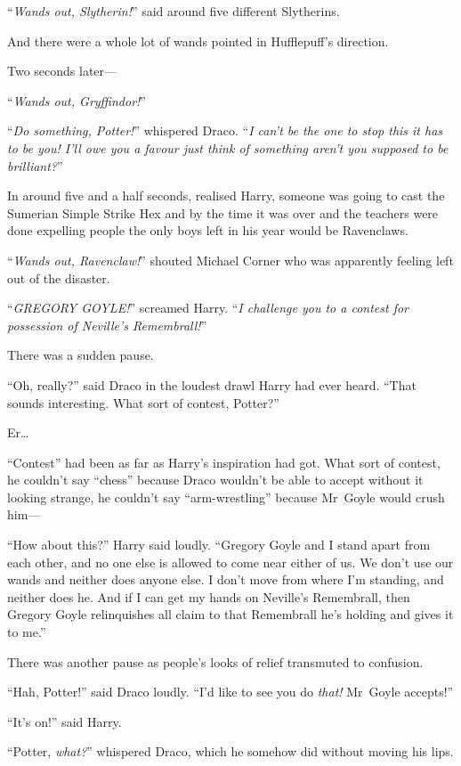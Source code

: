 “\emph{Wands out, Slytherin!}” said around five different Slytherins.

And there were a whole lot of wands pointed in Hufflepuff’s direction.

Two seconds later—

“\emph{Wands out, Gryffindor!}”

“\emph{Do something, Potter!}” whispered Draco. “\emph{I can’t be the one to stop this it has to be you! I’ll owe you a favour just think of something aren’t you supposed to be brilliant?}”

In around five and a half seconds, realised Harry, someone was going to cast the Sumerian Simple Strike Hex and by the time it was over and the teachers were done expelling people the only boys left in his year would be Ravenclaws.

“\emph{Wands out, Ravenclaw!}” shouted Michael Corner who was apparently feeling left out of the disaster.

“\emph{GREGORY GOYLE!}” screamed Harry. “\emph{I challenge you to a contest for possession of Neville’s Remembrall!}”

There was a sudden pause.

“Oh, really?” said Draco in the loudest drawl Harry had ever heard. “That sounds interesting. What sort of contest, Potter?”

Er…

“Contest” had been as far as Harry’s inspiration had got. What sort of contest, he couldn’t say “chess” because Draco wouldn’t be able to accept without it looking strange, he couldn’t say “arm-wrestling” because Mr~Goyle would crush him—

“How about this?” Harry said loudly. “Gregory Goyle and I stand apart from each other, and no one else is allowed to come near either of us. We don’t use our wands and neither does anyone else. I don’t move from where I’m standing, and neither does he. And if I can get my hands on Neville’s Remembrall, then Gregory Goyle relinquishes all claim to that Remembrall he’s holding and gives it to me.”

There was another pause as people’s looks of relief transmuted to confusion.

“Hah, Potter!” said Draco loudly. “I’d like to see you do \emph{that!} Mr~Goyle accepts!”

“It’s on!” said Harry.

“Potter, \emph{what?}” whispered Draco, which he somehow did without moving his lips.

